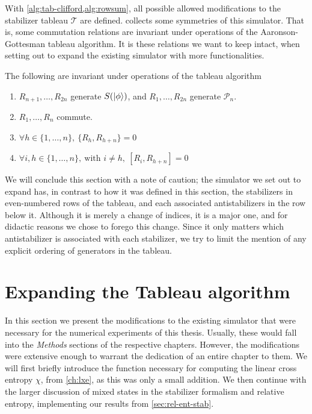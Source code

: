 With \cref{alg:tab-clifford,alg:rowsum}, all possible allowed modifications to
the stabilizer tableau $\mathcal{T}$ are defined.  collects
some symmetries of this simulator. That is, some commutation relations are
invariant under operations of the Aaronson-Gottesman tableau algorithm. It is
these relations we want to keep intact, when setting out to expand the existing
simulator with more functionalities.
\begin{prop}\label{prop:comm-tab}
  The following are invariant under operations of the tableau algorithm
  \begin{enumerate}
    \item $R_{n+1},\ldots,R_{2n}$ generate $S(\ket{\phi})$, and $R_1, \ldots,
      R_{2n}$ generate $\mathcal{P}_n$.
    \item $R_1, \ldots, R_n$ commute.
    \item $\forall h \in \{1,\ldots,n\}, \ \{R_h, R_{h+n}\} = 0$
    \item $\forall i,h \in \{1,\ldots,n\}, \ \text{with } i\neq h, \ [R_i, R_{h+n}] = 0$
  \end{enumerate}
\end{prop}
We will conclude this section with a note of caution; the simulator we set out
to expand has, in contrast to how it was defined in this section, the
stabilizers in even-numbered rows of the tableau, and each associated
antistabilizers in the row below it. Although it is merely a change of indices,
it is a major one, and for didactic reasons we chose to forego this change.
Since it only matters which antistabilizer is associated with each stabilizer,
we try to limit the mention of any explicit ordering of generators in the
tableau.

\section{Expanding the Tableau algorithm}\label{sec:expanding}
In this section we present the modifications to the existing simulator that
were necessary for the numerical experiments of this thesis. Usually, these
would fall into the \emph{Methods} sections of the respective
chapters. However, the modifications were extensive enough to warrant the
dedication of an entire chapter to them. We will first briefly introduce the function
necessary for computing the linear cross entropy $\chi$, from \cref{ch:lxe}, as
this was only a small addition. We
then continue with the larger discussion of mixed states in the stabilizer
formalism and relative
entropy, implementing our results from \cref{sec:rel-ent-stab}.

